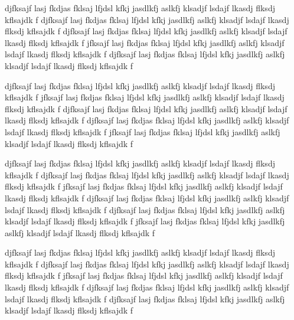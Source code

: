 \documentclass[twocolumn]{../../common/aa}
\begin{document}




djfksajf lasj fkdjas fklsaj lfjdsl kfkj jasdlkfj aslkfj klsadjf lsdajf lkasdj flksdj kflsajdk f
djfksajf lasj fkdjas fklsaj lfjdsl kfkj jasdlkfj aslkfj klsadjf lsdajf lkasdj flksdj kflsajdk f
djfksajf lasj fkdjas fklsaj lfjdsl kfkj jasdlkfj aslkfj klsadjf lsdajf lkasdj flksdj kflsajdk f
jfksajf lasj fkdjas fklsaj lfjdsl kfkj jasdlkfj aslkfj klsadjf lsdajf lkasdj flksdj kflsajdk f
djfksajf lasj fkdjas fklsaj lfjdsl kfkj jasdlkfj aslkfj klsadjf lsdajf lkasdj flksdj kflsajdk f

djfksajf lasj fkdjas fklsaj lfjdsl kfkj jasdlkfj aslkfj klsadjf lsdajf lkasdj flksdj kflsajdk f
jfksajf lasj fkdjas fklsaj lfjdsl kfkj jasdlkfj aslkfj klsadjf lsdajf lkasdj flksdj kflsajdk f
djfksajf lasj fkdjas fklsaj lfjdsl kfkj jasdlkfj aslkfj klsadjf lsdajf lkasdj flksdj kflsajdk f
djfksajf lasj fkdjas fklsaj lfjdsl kfkj jasdlkfj aslkfj klsadjf lsdajf lkasdj flksdj kflsajdk f
jfksajf lasj fkdjas fklsaj lfjdsl kfkj jasdlkfj aslkfj klsadjf lsdajf lkasdj flksdj kflsajdk f

djfksajf lasj fkdjas fklsaj lfjdsl kfkj jasdlkfj aslkfj klsadjf lsdajf lkasdj flksdj kflsajdk f
djfksajf lasj fkdjas fklsaj lfjdsl kfkj jasdlkfj aslkfj klsadjf lsdajf lkasdj flksdj kflsajdk f
jfksajf lasj fkdjas fklsaj lfjdsl kfkj jasdlkfj aslkfj klsadjf lsdajf lkasdj flksdj kflsajdk f
djfksajf lasj fkdjas fklsaj lfjdsl kfkj jasdlkfj aslkfj klsadjf lsdajf lkasdj flksdj kflsajdk f
djfksajf lasj fkdjas fklsaj lfjdsl kfkj jasdlkfj aslkfj klsadjf lsdajf lkasdj flksdj kflsajdk f
jfksajf lasj fkdjas fklsaj lfjdsl kfkj jasdlkfj aslkfj klsadjf lsdajf lkasdj flksdj kflsajdk f

djfksajf lasj fkdjas fklsaj lfjdsl kfkj jasdlkfj aslkfj klsadjf lsdajf lkasdj flksdj kflsajdk f
djfksajf lasj fkdjas fklsaj lfjdsl kfkj jasdlkfj aslkfj klsadjf lsdajf lkasdj flksdj kflsajdk f
jfksajf lasj fkdjas fklsaj lfjdsl kfkj jasdlkfj aslkfj klsadjf lsdajf lkasdj flksdj kflsajdk f
djfksajf lasj fkdjas fklsaj lfjdsl kfkj jasdlkfj aslkfj klsadjf lsdajf lkasdj flksdj kflsajdk f
djfksajf lasj fkdjas fklsaj lfjdsl kfkj jasdlkfj aslkfj klsadjf lsdajf lkasdj flksdj kflsajdk f
\end{document}
